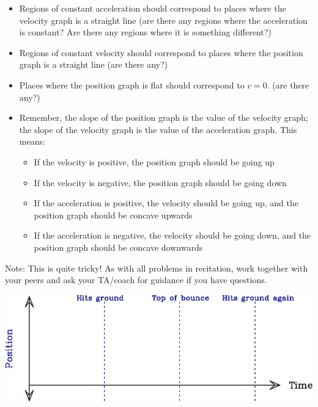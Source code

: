 \documentclass[12pt]{article}
\newcommand{\BI}{\begin{itemize}}
\newcommand{\EI}{\end{itemize}}
\begin{document}
\begin{enumerate}
\begin{minipage}{0.4\textwidth}
\BI
    \item Regions of constant acceleration should correspond to places where the velocity graph is a straight line (are there any regions where the acceleration is constant? Are there any regions where it is something different?)
    \item Regions of constant velocity should correspond to places where the position graph is a straight line (are there any?)
    \item Places where the position graph is flat should correspond to $v=0$. (are there any?)
    \item Remember, the slope of the position graph is the value of the velocity graph; the slope of the velocity graph is the value of the acceleration graph. This means:
    \begin{itemize}
    	\item If the velocity is positive, the position graph should be going up
    	\item If the velocity is negative, the position graph should be going down
    	\item If the acceleration is positive, the velocity should be going up, and the position graph should be concave upwards
    	\item If the acceleration is negative, the velocity should be going down, and the position graph should be concave downwards
    \end{itemize}
\EI
     

Note: This is quite tricky! As with all problems in recitation, work together with your peers and ask your TA/coach for guidance if you have questions.

\end{minipage}
\hspace{0.049\textwidth}
\begin{minipage}{0.5\textwidth}
\newpage
\begin{center}
	\includegraphics[width=\textwidth]{position-crop.pdf}
	
	\vspace{0.4in}
	

\end{center}
\end{minipage}
\end{enumerate}
\end{document}
